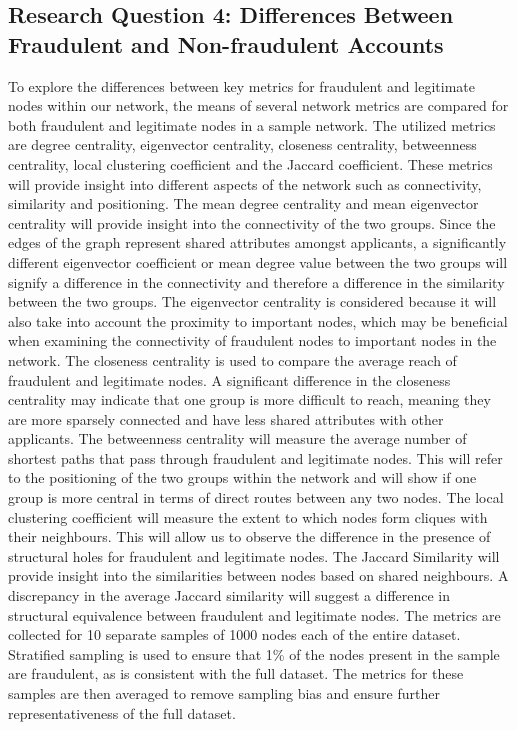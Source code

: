 \documentclass{styles/svproc}
\begin{document}
\subsection*{Research Question 4: Differences Between Fraudulent and Non-fraudulent Accounts}
To explore the differences between key metrics for fraudulent and legitimate nodes within our network, the means of several network metrics are compared for both fraudulent and legitimate nodes in a sample network. The utilized metrics are degree centrality, eigenvector centrality, closeness centrality, betweenness centrality, local clustering coefficient and the Jaccard coefficient. These metrics will provide insight into different aspects of the network such as connectivity, similarity and positioning.
The mean degree centrality and mean eigenvector centrality will provide insight into the connectivity of the two groups. Since the edges of the graph represent shared attributes amongst applicants, a significantly different eigenvector coefficient or mean degree value between the two groups will signify a difference in the connectivity and therefore a difference in the similarity between the two groups. The eigenvector centrality is considered because it will also take into account the proximity to important nodes, which may be beneficial when examining the connectivity of fraudulent nodes to important nodes in the network. The closeness centrality is used to compare the average reach of fraudulent and legitimate nodes. A significant difference in the closeness centrality may indicate that one group is more difficult to reach, meaning they are more sparsely connected and have less shared attributes with other applicants. The betweenness centrality will measure the average number of shortest paths that pass through fraudulent and legitimate nodes. This will refer to the positioning of the two groups within the network and will show if one group is more central in terms of direct routes between any two nodes. The local clustering coefficient will measure the extent to which nodes form cliques with their neighbours. This will allow us to observe the difference in the presence of structural holes for fraudulent and legitimate nodes. The Jaccard Similarity will provide insight into the similarities between nodes based on shared neighbours. A discrepancy in the average Jaccard similarity will suggest a difference in structural equivalence between fraudulent and legitimate nodes. 
The metrics are collected for 10 separate samples of 1000 nodes each of the entire dataset. Stratified sampling is used to ensure that 1\% of the nodes present in the sample are fraudulent, as is consistent with the full dataset. The metrics for these samples are then averaged to remove sampling bias and ensure further representativeness of the full dataset.
\end{document}
